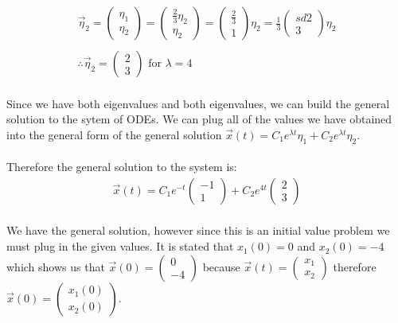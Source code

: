 \documentclass{jhwhw}
\begin{document}
\begin{align*}
    \vec\eta_2=\begin{pmatrix}
        \eta_1 \\ \eta_2
    \end{pmatrix} = \begin{pmatrix}
        \frac{2}{3}\eta_2 \\ \eta_2
    \end{pmatrix} = \begin{pmatrix}
        \frac{2}{3} \\ 1
    \end{pmatrix}\eta_2 = \frac{1}{3}\begin{pmatrix}sd
        2 \\ 3
    \end{pmatrix}\eta_2 \\ \\
    \therefore \vec\eta_2 = \begin{pmatrix}
        2 \\ 3
    \end{pmatrix} \text{ for } \lambda = 4
\end{align*}
\\
Since we have both eigenvalues and both eigenvalues, we can build the general solution to the sytem of ODEs. We can plug all of the values we have obtained into the general form of the general solution \(\vec x(t) = C_1 e^{\lambda{t}} \eta_1 + C_2 e^{\lambda{t}}\eta_2\).
\\ \\
Therefore the general solution to the system is:
\\
\begin{align*}
    \boxed{\vec x(t) = C_1 e^{-t} \begin{pmatrix} -1 \\ 1 \end{pmatrix} + C_2 e^{4t} \begin{pmatrix} 2 \\ 3 \end{pmatrix}}
\end{align*}
\\ 
We have the general solution, however since this is an initial value problem we must plug in the given values. It is stated that \(x_1(0) = 0\) and \(x_2(0) = -4\) which shows us that \(\vec x(0) = \begin{pmatrix} 0 \\ -4 \end{pmatrix}\) because \(\vec x(t) = \begin{pmatrix} x_1 \\ x_2 \end{pmatrix}\) therefore \(\vec x(0) = \begin{pmatrix} x_1(0)\\ x_2(0)\end{pmatrix}\).
\end{document}
